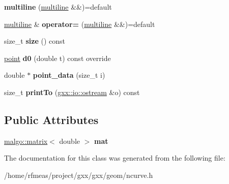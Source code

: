 \begin{DoxyCompactItemize}
\item 
{\bfseries multiline} (\hyperlink{classgxx_1_1ngeom_1_1multiline}{multiline} \&\&)=default\hypertarget{classgxx_1_1ngeom_1_1multiline_a31565dda8206f88ac25b7153140d2b6f}{}\label{classgxx_1_1ngeom_1_1multiline_a31565dda8206f88ac25b7153140d2b6f}

\item 
\hyperlink{classgxx_1_1ngeom_1_1multiline}{multiline} \& {\bfseries operator=} (\hyperlink{classgxx_1_1ngeom_1_1multiline}{multiline} \&\&)=default\hypertarget{classgxx_1_1ngeom_1_1multiline_afcfa1ef1d3260c6fe4bde5cd36455de9}{}\label{classgxx_1_1ngeom_1_1multiline_afcfa1ef1d3260c6fe4bde5cd36455de9}

\item 
size\+\_\+t {\bfseries size} () const \hypertarget{classgxx_1_1ngeom_1_1multiline_a7845ffd1f7c904f67e6f04c49cb98d6a}{}\label{classgxx_1_1ngeom_1_1multiline_a7845ffd1f7c904f67e6f04c49cb98d6a}

\item 
\hyperlink{classgxx_1_1ngeom_1_1point}{point} {\bfseries d0} (double t) const override\hypertarget{classgxx_1_1ngeom_1_1multiline_ae8dce31d18a921f03eb185485af0b2c4}{}\label{classgxx_1_1ngeom_1_1multiline_ae8dce31d18a921f03eb185485af0b2c4}

\item 
double $\ast$ {\bfseries point\+\_\+data} (size\+\_\+t i)\hypertarget{classgxx_1_1ngeom_1_1multiline_a036af04faf7d4b778d8bb44a73036aad}{}\label{classgxx_1_1ngeom_1_1multiline_a036af04faf7d4b778d8bb44a73036aad}

\item 
size\+\_\+t {\bfseries print\+To} (\hyperlink{classgxx_1_1io_1_1ostream}{gxx\+::io\+::ostream} \&o) const \hypertarget{classgxx_1_1ngeom_1_1multiline_a6a1f45ca7d25629873df99c7987444b3}{}\label{classgxx_1_1ngeom_1_1multiline_a6a1f45ca7d25629873df99c7987444b3}

\end{DoxyCompactItemize}
\subsection*{Public Attributes}
\begin{DoxyCompactItemize}
\item 
\hyperlink{classmalgo_1_1matrix}{malgo\+::matrix}$<$ double $>$ {\bfseries mat}\hypertarget{classgxx_1_1ngeom_1_1multiline_aebf4155d8ae67f10c5a72e368e815e47}{}\label{classgxx_1_1ngeom_1_1multiline_aebf4155d8ae67f10c5a72e368e815e47}

\end{DoxyCompactItemize}


The documentation for this class was generated from the following file\+:\begin{DoxyCompactItemize}
\item 
/home/rfmeas/project/gxx/gxx/geom/ncurve.\+h\end{DoxyCompactItemize}
